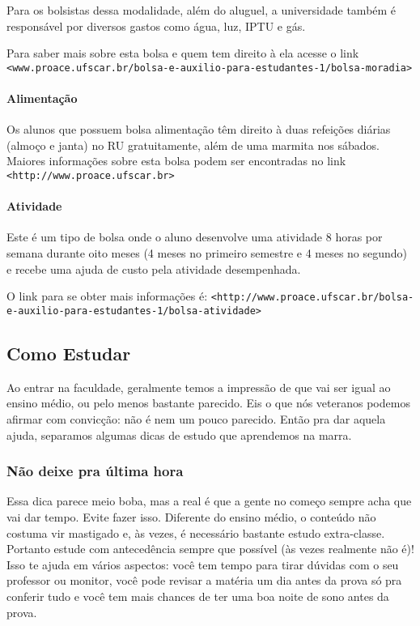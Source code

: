 Para os bolsistas dessa modalidade, além do aluguel, a universidade também é responsável por diversos gastos como água, luz, IPTU e gás.

Para saber mais sobre esta bolsa e quem tem direito à ela acesse o link \newline \texttt{<www.proace.ufscar.br/bolsa-e-auxilio-para-estudantes-1/bolsa-moradia>}

\paragraph{Alimentação}
Os alunos que possuem bolsa alimentação têm direito à duas refeições diárias (almoço e janta) no RU gratuitamente, além de uma marmita nos sábados.
\newline \newline Maiores informações sobre esta bolsa podem ser encontradas no link \texttt{<http://www.proace.ufscar.br>}

\paragraph{Atividade}
Este é um tipo de bolsa onde o aluno desenvolve uma atividade 8 horas por semana durante oito meses (4 meses no primeiro semestre e 4 meses no segundo) e recebe uma ajuda de custo pela atividade desempenhada.

O link para se obter mais informações é:
\newline \texttt{<http://www.proace.ufscar.br/bolsa-e-auxilio-para-estudantes-1/bolsa-atividade>}

\subsection{Como Estudar}
Ao entrar na faculdade, geralmente temos a impressão de que vai ser igual ao ensino médio, ou pelo menos bastante parecido. Eis o que nós veteranos podemos afirmar com convicção: não é nem um pouco parecido. Então pra dar aquela ajuda, separamos algumas dicas de estudo que aprendemos na marra.

\subsubsection{Não deixe pra última hora}
Essa dica parece meio boba, mas a real é que a gente no começo sempre acha que vai dar tempo. Evite fazer isso. Diferente do ensino médio, o conteúdo não costuma vir mastigado e, às vezes, é necessário bastante estudo extra-classe. Portanto estude com antecedência sempre que possível (às vezes realmente não é)! Isso te ajuda em vários aspectos: você tem tempo para tirar dúvidas com o seu professor ou monitor, você pode revisar a matéria um dia antes da prova só pra conferir tudo e você tem mais chances de ter uma boa noite de sono antes da prova.

